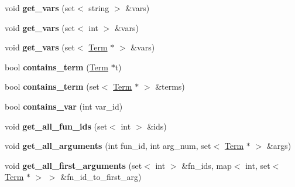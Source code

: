 \begin{DoxyCompactItemize}
\item 
\hypertarget{classTerm_a1e419cac626845aa67865a120cd4a47d}{void {\bfseries get\-\_\-vars} (set$<$ string $>$ \&vars)}\label{classTerm_a1e419cac626845aa67865a120cd4a47d}

\item 
\hypertarget{classTerm_afa91787e5b03d2905d260ba4b62a2316}{void {\bfseries get\-\_\-vars} (set$<$ int $>$ \&vars)}\label{classTerm_afa91787e5b03d2905d260ba4b62a2316}

\item 
\hypertarget{classTerm_a91c02985966cc4585bacce557d88fb40}{void {\bfseries get\-\_\-vars} (set$<$ \hyperlink{classTerm}{\-Term} $\ast$ $>$ \&vars)}\label{classTerm_a91c02985966cc4585bacce557d88fb40}

\item 
\hypertarget{classTerm_a7dd250f12b42f9fd5e4b5d1c69f3de54}{bool {\bfseries contains\-\_\-term} (\hyperlink{classTerm}{\-Term} $\ast$t)}\label{classTerm_a7dd250f12b42f9fd5e4b5d1c69f3de54}

\item 
\hypertarget{classTerm_a14c34b9e24c7030786b690edf342dc19}{bool {\bfseries contains\-\_\-term} (set$<$ \hyperlink{classTerm}{\-Term} $\ast$ $>$ \&terms)}\label{classTerm_a14c34b9e24c7030786b690edf342dc19}

\item 
\hypertarget{classTerm_a7a1e02886dc59a52ebadc5a4d26dad7b}{bool {\bfseries contains\-\_\-var} (int var\-\_\-id)}\label{classTerm_a7a1e02886dc59a52ebadc5a4d26dad7b}

\item 
\hypertarget{classTerm_a6d0357f6ea3cde2c7985f1ea173eb8fe}{void {\bfseries get\-\_\-all\-\_\-fun\-\_\-ids} (set$<$ int $>$ \&ids)}\label{classTerm_a6d0357f6ea3cde2c7985f1ea173eb8fe}

\item 
\hypertarget{classTerm_ae7b58efd92e0f765751b75ef3b1e8bdd}{void {\bfseries get\-\_\-all\-\_\-arguments} (int fun\-\_\-id, int arg\-\_\-num, set$<$ \hyperlink{classTerm}{\-Term} $\ast$ $>$ \&args)}\label{classTerm_ae7b58efd92e0f765751b75ef3b1e8bdd}

\item 
\hypertarget{classTerm_a1d2acc1e9bafa53dccd3a2a36e97a078}{void {\bfseries get\-\_\-all\-\_\-first\-\_\-arguments} (set$<$ int $>$ \&fn\-\_\-ids, map$<$ int, set$<$ \hyperlink{classTerm}{\-Term} $\ast$ $>$ $>$ \&fn\-\_\-id\-\_\-to\-\_\-first\-\_\-arg)}\label{classTerm_a1d2acc1e9bafa53dccd3a2a36e97a078}


\end{DoxyCompactItemize}
